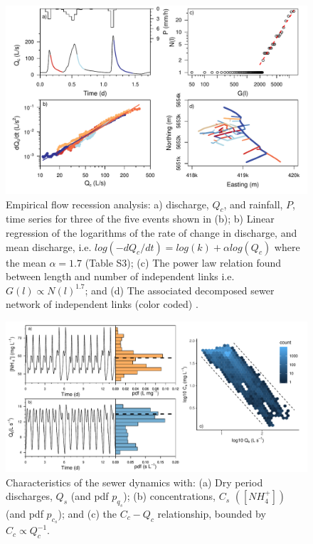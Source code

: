 \documentclass{agujournal2018}
\begin{document}
   \begin{figure}[ht]
 \centering
\includegraphics[width=30pc]{Fig4.pdf}
 \caption{Empirical f\/low recession analysis: a) discharge, $Q_c$, and rainfall, $P$, time series for three of the f\/ive events shown in (b); b) Linear regression of the logarithms of the rate of change in discharge, and mean discharge, i.e. $log(-dQ_c/dt) = log(k) +  \alpha log(Q_c)$ where the mean $\alpha = 1.7$ (Table S3); (c) The power law relation found between length and number of independent links i.e. $G(l) \propto N(l)^{1.7}$; and (d) The associated decomposed sewer network of independent links (color coded)  \citep{Biswal_2014}.}
 \label{figthree}
  \end{figure}
  
 \begin{figure}[ht]
 \centering
\includegraphics[width=30pc]{Fig3.pdf}
\caption{Characteristics of the sewer dynamics with: (a) Dry period discharges, $Q_s$ (and pdf $p_{q_s}$); (b) concentrations, $C_s$ $([NH_4^+])$ (and pdf $p_{c_s}$); and (c) the $C_c-Q_c$ relationship, bounded by $C_c \propto Q_c^{-1}$.}
 \label{figfour}
 \end{figure}
\end{document}
